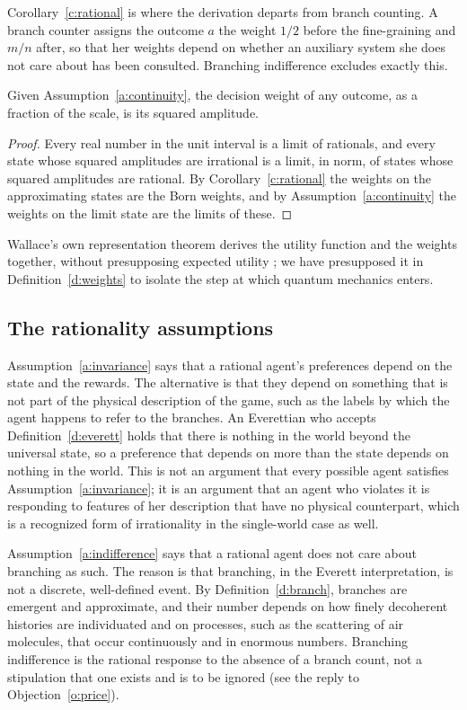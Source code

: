 \documentclass{situationist-preprint}
\begin{document}
Corollary~\ref{c:rational} is where the derivation departs from branch counting. A branch counter assigns the outcome $a$ the weight $1/2$ before the fine-graining and $m/n$ after, so that her weights depend on whether an auxiliary system she does not care about has been consulted. Branching indifference excludes exactly this.

\begin{proposition}\label{p:irrational}
Given Assumption~\ref{a:continuity}, the decision weight of any outcome, as a fraction of the scale, is its squared amplitude.
\end{proposition}

\begin{proof}
Every real number in the unit interval is a limit of rationals, and every state whose squared amplitudes are irrational is a limit, in norm, of states whose squared amplitudes are rational. By Corollary~\ref{c:rational} the weights on the approximating states are the Born weights, and by Assumption~\ref{a:continuity} the weights on the limit state are the limits of these.
\end{proof}

Wallace's own representation theorem derives the utility function and the weights together, without presupposing expected utility \citep{Wallace2012}; we have presupposed it in Definition~\ref{d:weights} to isolate the step at which quantum mechanics enters.

\subsection{The rationality assumptions}

Assumption~\ref{a:invariance} says that a rational agent's preferences depend on the state and the rewards. The alternative is that they depend on something that is not part of the physical description of the game, such as the labels by which the agent happens to refer to the branches. An Everettian who accepts Definition~\ref{d:everett} holds that there is nothing in the world beyond the universal state, so a preference that depends on more than the state depends on nothing in the world. This is not an argument that every possible agent satisfies Assumption~\ref{a:invariance}; it is an argument that an agent who violates it is responding to features of her description that have no physical counterpart, which is a recognized form of irrationality in the single-world case as well.

Assumption~\ref{a:indifference} says that a rational agent does not care about branching as such. The reason is that branching, in the Everett interpretation, is not a discrete, well-defined event. By Definition~\ref{d:branch}, branches are emergent and approximate, and their number depends on how finely decoherent histories are individuated and on processes, such as the scattering of air molecules, that occur continuously and in enormous numbers. Branching indifference is the rational response to the absence of a branch count, not a stipulation that one exists and is to be ignored (see the reply to Objection~\ref{o:price}).
\end{document}
